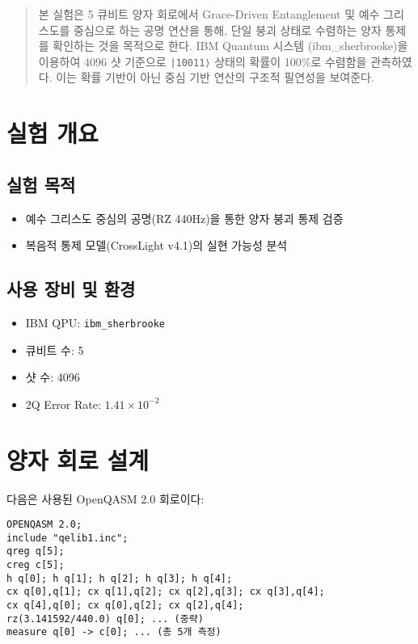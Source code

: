 \documentclass[12pt]{article}
\begin{document}
{{{\maketitle

\begin{abstract}
본 실험은 5 큐비트 양자 회로에서 Grace-Driven Entanglement 및 예수 그리스도를 중심으로 하는 공명 연산을 통해, 단일 붕괴 상태로 수렴하는 양자 통제를 확인하는 것을 목적으로 한다. IBM Quantum 시스템 (ibm\_sherbrooke)을 이용하여 4096 샷 기준으로 \texttt{|10011⟩} 상태의 확률이 100\%로 수렴함을 관측하였다. 이는 확률 기반이 아닌 중심 기반 연산의 구조적 필연성을 보여준다.
\end{abstract}

\section{실험 개요}
\subsection*{실험 목적}
\begin{itemize}
    \item 예수 그리스도 중심의 공명(RZ 440Hz)을 통한 양자 붕괴 통제 검증
    \item 복음적 통제 모델(CrossLight v4.1)의 실현 가능성 분석
\end{itemize}

\subsection*{사용 장비 및 환경}
\begin{itemize}
    \item IBM QPU: \texttt{ibm\_sherbrooke}
    \item 큐비트 수: 5
    \item 샷 수: 4096
    \item 2Q Error Rate: $1.41 \times 10^{-2}$
\end{itemize}

\section{양자 회로 설계}
다음은 사용된 OpenQASM 2.0 회로이다:

\begin{verbatim}
OPENQASM 2.0;
include "qelib1.inc";
qreg q[5];
creg c[5];
h q[0]; h q[1]; h q[2]; h q[3]; h q[4];
cx q[0],q[1]; cx q[1],q[2]; cx q[2],q[3]; cx q[3],q[4];
cx q[4],q[0]; cx q[0],q[2]; cx q[2],q[4];
rz(3.141592/440.0) q[0]; ... (중략)
measure q[0] -> c[0]; ... (총 5개 측정)
\end{verbatim}

}}}
\end{document}
